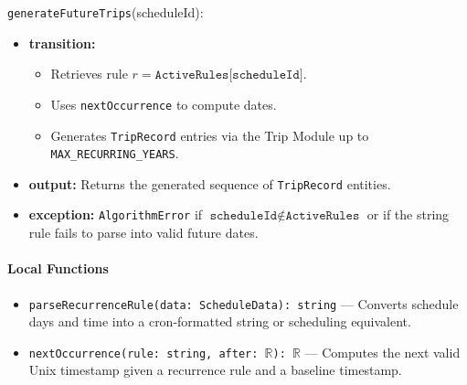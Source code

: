 \texttt{generateFutureTrips}(scheduleId):
\begin{itemize}
    \item \textbf{transition:} 
    \begin{itemize}
        \item Retrieves rule $r = \texttt{ActiveRules[scheduleId]}$.
        \item Uses \texttt{nextOccurrence} to compute dates.
        \item Generates \texttt{TripRecord} entries via the Trip Module up to \texttt{MAX\_RECURRING\_YEARS}.
    \end{itemize}
    \item \textbf{output:} Returns the generated sequence of \texttt{TripRecord} entities.
    \item \textbf{exception:} \texttt{AlgorithmError} if $\texttt{scheduleId} \notin \texttt{ActiveRules}$ or if the string rule fails to parse into valid future dates.
\end{itemize}

\paragraph{Local Functions}
\begin{itemize}
    \item \texttt{parseRecurrenceRule(data: ScheduleData): string} --- Converts schedule days and time into a cron-formatted string or scheduling equivalent.
    \item \texttt{nextOccurrence(rule: string, after: $\mathbb{R}$): $\mathbb{R}$} --- Computes the next valid Unix timestamp given a recurrence rule and a baseline timestamp.
\end{itemize}